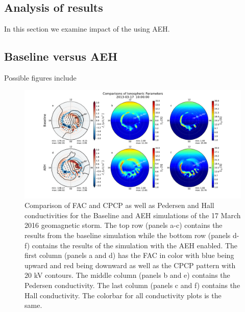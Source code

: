 \documentclass[draft,jgrga]{agutex}
\begin{document}
\begin{article}
\section{Analysis of results}
\label{sec-analysis}
In this section we examine impact of the using AEH.

\subsection{Baseline versus AEH}
Possible figures include 

\begin{figure}[t]
\noindent\includegraphics[width=39pc]{JGRPaper-IonPatterns.pdf}
\caption{\label{ion-comp-fig}
Comparison of FAC and CPCP as well as Pedersen and Hall conductivities for the Baseline and AEH simulations of the 17 March 2016 geomagnetic storm.  The top row (panels a-c) contains the results from the baseline simulation while the bottom row (panels d-f) contains the results of the simulation with the AEH enabled.  The first column (panels a and d) has the FAC in color with blue being upward and red being downward as well as the CPCP pattern with 20 kV contours.  The middle column (panels b and e) contains the Pedersen conductivity.  The last column (panels c and f) contains the Hall conductivity.  The colorbar for all conductivity plots is the same.}
\end{figure}


\end{article}
\end{document}
